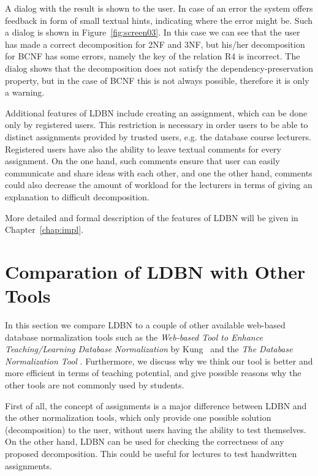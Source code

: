 A dialog with the result is shown to the user. In case of an error the system offers
feedback in form of small textual hints, indicating
where the error might be. Such a dialog is shown in Figure~\ref{fig:screen03}. In this case
we can see that the user has made a correct decomposition for 2NF and 3NF,
but his/her decomposition for BCNF has some errors, namely the key of the relation R4 is
incorrect. The dialog shows that the decomposition does not 
satisfy the dependency-preservation property, but in the case of BCNF this
is not always possible, therefore it is only a warning. 

Additional features of LDBN include creating an assignment, which can be done 
only by registered users. This restriction is necessary in order users to be able 
to distinct assignments provided by trusted users, e.g. the database course
lecturers. Registered users have also the ability to leave textual comments 
for every assignment. On the one hand, such
comments ensure that user can easily communicate and share ideas
with each other, and one the other hand, comments could also decrease the amount of workload
for the lecturers in terms of giving an explanation to difficult decomposition.

More detailed and formal description of the features of LDBN will be given in
Chapter~\ref{chap:impl}. 

\section{Comparation of LDBN with Other Tools}
\label{sec:comparation}
In this section we compare LDBN to a couple of other 
available web-based database normalization tools 
such as the \textit{Web-based Tool to Enhance Teaching/Learning Database 
Normalization} by Kung~\cite{p8} and the \textit{The Database Normalization Tool}
\cite{w1}. Furthermore, we discuss why we think our tool is better 
and more efficient
in terms of teaching potential, and give possible reasons why the 
other tools are not commonly used by students.

First of all, the concept of assignments is a major
difference between LDBN and the other normalization tools, 
which only provide 
one possible solution (decomposition) to the user, without users having the ability to test 
themselves. On the other hand, LDBN can be used for checking the correctness of any
proposed decomposition. This could be useful for lectures to test handwritten assignments. 

